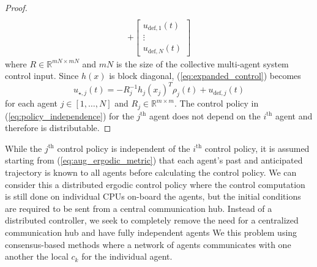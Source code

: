 \documentclass[letterpaper, 10 pt, conference]{ieeeconf}  %
\begin{document}
\begin{proof}
\begin{multline}
 \\+
 \begin{bmatrix}
 u_{\text{def},1} (t) \\
 \vdots \\
 u_{\text{def},N}(t)
 \end{bmatrix}
\end{multline}
where $R\in\mathbb{R}^{mN \times mN}$ and $mN$ is the size of the collective multi-agent system control input.
Since $h(x)$ is block diagonal,  (\ref{eq:expanded_control}) becomes
\begin{equation}\label{eq:policy_independence}
u_{\star,j} (t) = -R_j^{-1} h_j(x_j)^T \rho_j(t) + u_{\text{def},j}(t) 
\end{equation}
for each agent $j \in \left[ 1, \ldots, N \right]$ and $R_j \in \mathbb{R}^{m \times m}$.
The control policy in (\ref{eq:policy_independence}) for the $j^\text{th}$ agent does not depend on the $i^\text{th}$ agent and therefore is distributable.
\end{proof}

While the $j^\text{th}$ control policy is independent of the $i^\text{th}$ control policy, it is assumed starting from (\ref{eq:aug_ergodic_metric}) that each agent's past and anticipated trajectory is known to all agents before calculating the control policy.
We can consider this a distributed ergodic control policy where the control computation is still done on individual CPUs on-board the agents, but the initial conditions are required to be sent from a central communication hub. 
Instead of a distributed controller, we seek to completely remove the need for a centralized communication hub and have fully independent agents 
We  this problem using consensus-based methods where a network of agents communicates with one another the local $c_k$ for the individual agent. 
\end{document}
